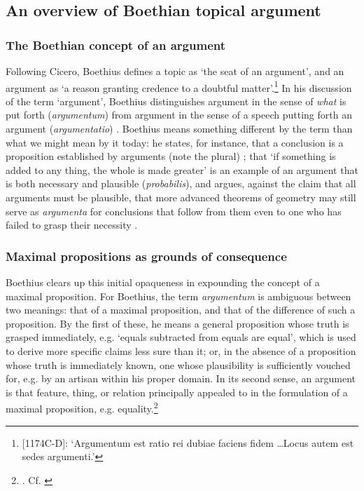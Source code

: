 \documentclass[a4paper, 11pt]{article}
\begin{document}
\subsection{An overview of Boethian topical argument}
\subsubsection{The Boethian concept of an argument}
Following Cicero, Boethius defines a topic as `the seat of an argument', and an argument as `a reason granting credence to a doubtful matter'.\footnote{[1174C-D]\autocite{BDT}: `Argumentum est ratio rei dubiae faciens fidem \ldots Locus autem est sedes argumenti.'} In his discussion of the term `argument', Boethius distinguishes argument in the sense of \emph{what} is put forth (\emph{argumentum}) from argument in the sense of a speech putting forth an argument (\emph{argumentatio}) \autocite[1174C]{BDT}. Boethius means something different by the term than what we might mean by it today: he states, for instance, that a conclusion is a proposition established by arguments (note the plural) \autocite[1180C]{BDT}; that `if something is added to any thing, the whole is made greater' is an example of an argument that is both necessary and plausible (\emph{probabilis}), and argues, against the claim that all arguments must be plausible, that more advanced theorems of geometry may still serve as \emph{argumenta} for conclusions that follow from them even to one who has failed to grasp their necessity \autocite[1181A-C]{BDT}. 

\subsubsection{Maximal propositions as grounds of consequence}
Boethius clears up this initial opaqueness in expounding the concept of a maximal proposition. For Boethius, the term \emph{argumentum} is ambiguous between two meanings: that of a maximal proposition, and that of the difference of such a proposition. By the first of these, he means a general proposition whose truth is grasped immediately, e.g. `equals subtracted from equals are equal', which is used to derive more specific claims less sure than it; or, in the absence of a proposition whose truth is immediately known, one whose plausibility is sufficiently vouched for, e.g. by an artisan within his proper domain. In its second sense, an argument is that feature, thing, or relation principally appealed to in the formulation of a maximal proposition, e.g. equality.\footnote{\autocite[1185A-B]{BDT}. Cf. \autocite{Holopainen2007,Archambault2017e}} 
\end{document}
